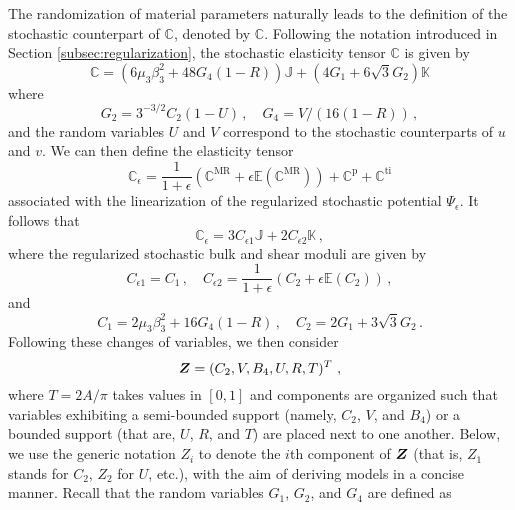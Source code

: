 The randomization of material parameters naturally leads to the definition of the stochastic counterpart of $\mathbb{C}$, denoted by $\pmb{\mathbb{C}}$. Following the notation introduced in Section \ref{subsec:regularization}, the stochastic elasticity tensor $\pmb{\mathbb{C}}$ is given by
\begin{equation}
    \pmb{\mathbb{C}} = (6 \mu_3 \beta_3^2 + 48 G_4(1 - R))\mathbb{J} + (4G_1 + 6\sqrt{3}G_2) \mathbb{K}
\end{equation}
where
\begin{equation}
    G_2 = 3^{-3/2} C_2 (1 - U)\,, \quad G_4 = V/\left(16(1-R)\right)\,,
\end{equation}
and the random variables $U$ and $V$ correspond to the stochastic counterparts of $u$ and $v$. We can then define the elasticity tensor
\begin{equation}
    \pmb{\mathbb{C}}_{\epsilon} = \frac{1}{1+\epsilon}( \pmb{\mathbb{C}}^{\text{MR}} + \epsilon \mathbb{E}(\pmb{\mathbb{C}}^{\text{MR}})) + \mathbb{C}^{\text{p}} + \pmb{\mathbb{C}}^{\text{ti}}
\end{equation}
associated with the linearization of the regularized stochastic potential $\Psi_{\epsilon}$. It follows that
\begin{equation}
    \pmb{\mathbb{C}}_{\epsilon} = 3 C_{\epsilon 1} \mathbb{J} + 2 C_{\epsilon 2}\mathbb{K}\,,
\end{equation}
where the regularized stochastic bulk and shear moduli are given by
\begin{equation}
    C_{\epsilon 1} = C_1\,, \quad C_{\epsilon 2} = \frac{1}{1+\epsilon}(C_2 + \epsilon \mathbb{E}(C_2))\,,
\end{equation}
and
\begin{equation}
    C_{1} = 2 \mu_3 \beta_3^2 + 16 G_4(1 - R)\,, \quad C_{2} = 2G_1+3\sqrt{3}G_2\,.
\end{equation}
Following these changes of variables, we then consider 
\begin{equation}
    \boldsymbol{Z} = (C_2, V, B_4, U, R, T)^T~,
\end{equation}
where $T = 2A/\pi$ takes values in $[0,1]$ and components are organized such that variables exhibiting a semi-bounded support (namely, $C_2$, $V$, and $B_4$) or a bounded support (that are, $U$, $R$, and $T$) are placed next to one another. Below, we use the generic notation $Z_i$ to denote the $i$th component of $\boldsymbol{Z}$ (that is, $Z_1$ stands for $C_2$, $Z_2$ for $U$, etc.), with the aim of deriving models in a concise manner. Recall that the random variables $G_1$, $G_2$, and $G_4$ are defined as
